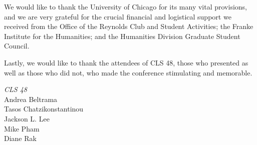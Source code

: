 \documentclass[12pt]{article}
\begin{document}
We would like to thank the University of Chicago for its many vital provisions, and we are very grateful for the crucial financial and logistical support we received from the Office of the Reynolds Club and Student Activities; the Franke Institute for the Humanities; and the Humanities Division Graduate Student Council. 

Lastly, we would like to thank the attendees of CLS 48, those who presented as well as those who did not, who made the conference stimulating and memorable.

\vspace{1em}

\noindent \textit{CLS 48}\\
Andrea Beltrama\\
Tasos Chatzikonstantinou\\
Jackson L. Lee\\
Mike Pham\\
Diane Rak
\end{document}
